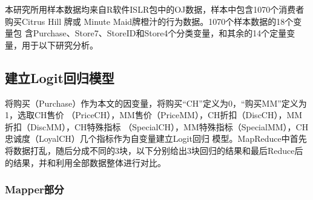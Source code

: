 本研究所用样本数据均来自R软件ISLR包中的OJ数据，样本中包含1070个消费者购买Citrus
Hill 牌或 Minute Maid牌橙汁的行为数据。1070个样本数据的18个变量包
含Purchase、Store7、StoreID和Store4个分类变量，和其余的14个定量变量，用于以下研究分析。

\subsection{建立Logit回归模型}\label{ux5efaux7acblogitux56deux5f52ux6a21ux578b}

将购买（Purchase）作为本文的因变量，将购买``CH''定义为0，``购买MM''定义为1，选取CH售价
（PriceCH），MM售价（PriceMM），CH折扣（DiscCH），MM折扣（DiscMM），CH特殊指标
（SpecialCH），MM特殊指标（SpecialMM），CH忠诚度（LoyalCH）几个指标作为自变量建立Logit回归
模型。MapReduce中首先将数据打乱，随后分成不同的3块，以下分别给出3块回归的结果和最后Reduce后
的结果，并和利用全部数据整体进行对比。

\subsubsection{Mapper部分}\label{mapperux90e8ux5206}

